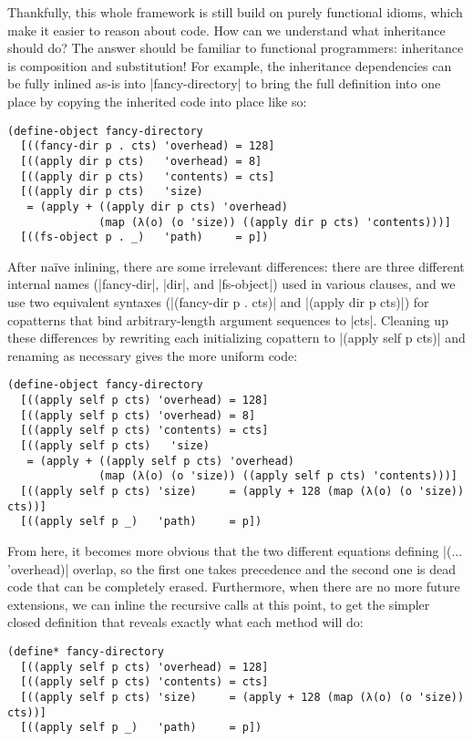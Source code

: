Thankfully, this whole framework is still build on purely functional idioms, which make it easier to reason about code.
How can we understand what inheritance should do?
The answer should be familiar to functional programmers: inheritance is composition and substitution!
For example, the inheritance dependencies can be fully inlined as-is into \scm|fancy-directory| to bring the full definition into one place by copying the inherited code into place like so:
\begin{verbatim}
(define-object fancy-directory
  [((fancy-dir p . cts) 'overhead) = 128]
  [((apply dir p cts)   'overhead) = 8]
  [((apply dir p cts)   'contents) = cts]
  [((apply dir p cts)   'size)
   = (apply + ((apply dir p cts) 'overhead)
              (map (λ(o) (o 'size)) ((apply dir p cts) 'contents)))]
  [((fs-object p . _)   'path)     = p])
\end{verbatim}
After na\"ive inlining, there are some irrelevant differences: there are three different internal names (\scm|fancy-dir|, \scm|dir|, and \scm|fs-object|) used in various clauses, and we use two equivalent syntaxes  (\scm|(fancy-dir p . cts)| and \scm|(apply dir p cts)|) for copatterns that bind arbitrary-length argument sequences to \scm|cts|.
Cleaning up these differences by rewriting each initializing copattern to \scm|(apply self p cts)| and renaming as necessary gives the more uniform code:
\begin{verbatim}
(define-object fancy-directory
  [((apply self p cts) 'overhead) = 128]
  [((apply self p cts) 'overhead) = 8]
  [((apply self p cts) 'contents) = cts]
  [((apply self p cts)   'size)
   = (apply + ((apply self p cts) 'overhead)
              (map (λ(o) (o 'size)) ((apply self p cts) 'contents)))]
  [((apply self p cts) 'size)     = (apply + 128 (map (λ(o) (o 'size)) cts))]
  [((apply self p _)   'path)     = p])
\end{verbatim}
From here, it becomes more obvious that the two different equations defining \scm|(... 'overhead)| overlap, so the first one takes precedence and the second one is dead code that can be completely erased.
Furthermore, when there are no more future extensions, we can inline the recursive calls at this point, to get the simpler closed definition that reveals exactly what each method will do:
\begin{verbatim}
(define* fancy-directory
  [((apply self p cts) 'overhead) = 128]
  [((apply self p cts) 'contents) = cts]
  [((apply self p cts) 'size)     = (apply + 128 (map (λ(o) (o 'size)) cts))]
  [((apply self p _)   'path)     = p])
\end{verbatim}


